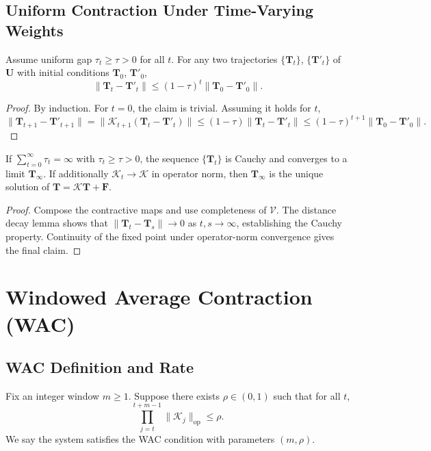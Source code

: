 \documentclass[11pt]{article}
\begin{document}
\subsection{Uniform Contraction Under Time-Varying Weights}

\begin{lemma}
Assume uniform gap $\tau_t \geq \tau > 0$ for all $t$. For any two trajectories $\{\mathbf{T}_t\}$, $\{\mathbf{T}'_t\}$ of $\mathbf{U}$ with initial conditions $\mathbf{T}_0$, $\mathbf{T}'_0$,
\[
\|\mathbf{T}_t - \mathbf{T}'_t\| \leq (1 - \tau)^t \|\mathbf{T}_0 - \mathbf{T}'_0\|.
\]
\end{lemma}

\begin{proof}
By induction. For $t = 0$, the claim is trivial. Assuming it holds for $t$,
\[
\|\mathbf{T}_{t+1} - \mathbf{T}'_{t+1}\| = \|\mathcal{K}_{t+1}(\mathbf{T}_t - \mathbf{T}'_t)\| \leq (1 - \tau)\|\mathbf{T}_t - \mathbf{T}'_t\| \leq (1 - \tau)^{t+1}\|\mathbf{T}_0 - \mathbf{T}'_0\|.
\]
\end{proof}

\begin{theorem}
If $\sum_{t=0}^{\infty} \tau_t = \infty$ with $\tau_t \geq \tau > 0$, the sequence $\{\mathbf{T}_t\}$ is Cauchy and converges to a limit $\mathbf{T}_\infty$. If additionally $\mathcal{K}_t \to \mathcal{K}$ in operator norm, then $\mathbf{T}_\infty$ is the unique solution of $\mathbf{T} = \mathcal{K}\mathbf{T} + \mathbf{F}$.
\end{theorem}

\begin{proof}
Compose the contractive maps and use completeness of $\mathcal{V}$. The distance decay lemma shows that $\|\mathbf{T}_t - \mathbf{T}_s\| \to 0$ as $t, s \to \infty$, establishing the Cauchy property. Continuity of the fixed point under operator-norm convergence gives the final claim.
\end{proof}

\section{Windowed Average Contraction (WAC)}

\subsection{WAC Definition and Rate}

\begin{definition}
Fix an integer window $m \geq 1$. Suppose there exists $\rho \in (0,1)$ such that for all $t$,
\[
\prod_{j=t}^{t+m-1} \|\mathcal{K}_j\|_{\mathrm{op}} \leq \rho.
\]
We say the system satisfies the WAC condition with parameters $(m, \rho)$.
\end{definition}
\end{document}
